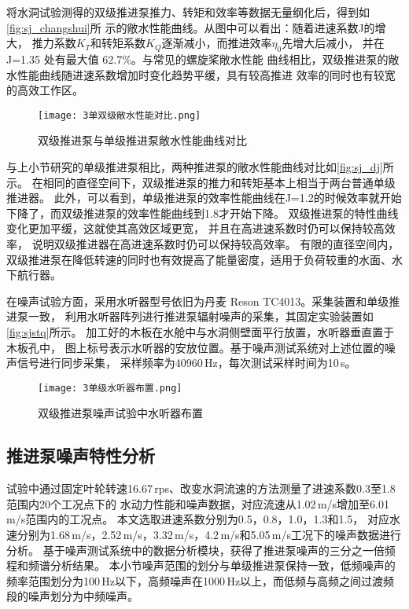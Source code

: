 将水洞试验测得的双级推进泵推力、转矩和效率等数据无量纲化后，得到如\autoref{fig:sj_changshui}所
示的敞水性能曲线。从图中可以看出：随着进速系数J的增大，
推力系数$K_T$和转矩系数$K_Q$逐渐减小，而推进效率$\eta_0$先增大后减小，
并在 J=1.35 处有最大值 62.7\%。与常见的螺旋桨敞水性能
曲线相比，双级推进泵的敞水性能曲线随进速系数增加时变化趋势平缓，具有较高推进
效率的同时也有较宽的高效工作区。
\begin{figure}[htbp]
    \centering
    \texttt{[image: 3单双级敞水性能对比.png]}
    \caption{\label{fig:sj_dj}双级推进泵与单级推进泵敞水性能曲线对比}
\end{figure}

与上小节研究的单级推进泵相比，两种推进泵的敞水性能曲线对比如\autoref{fig:sj_dj}所示。
在相同的直径空间下，双级推进泵的推力和转矩基本上相当于两台普通单级推进器。
此外，可以看到，单级推进泵的效率性能曲线在J=1.2的时候效率就开始下降了，而双级推进泵的效率性能曲线到1.8才开始下降。
双级推进泵的特性曲线变化更加平缓，这就使其高效区域更宽，
并且在高进速系数时仍可以保持较高效率，
说明双级推进器在高进速系数时仍可以保持较高效率。
有限的直径空间内，双级推进泵在降低转速的同时也有效提高了能量密度，适用于负荷较重的水面、水下航行器。

在噪声试验方面，采用水听器型号依旧为丹麦 Reson TC4013。采集装置和单级推进泵一致，
利用水听器阵列进行推进泵辐射噪声的采集，其固定实验装置如\autoref{fig:sjstq}所示。
加工好的木板在水舱中与水洞侧壁面平行放置，水听器垂直置于木板孔中，
图上标号表示水听器的安放位置。基于噪声测试系统对上述位置的噪声信号进行同步采集，
采样频率为40960\,Hz，每次测试采样时间为10\,s。
\begin{figure}[htbp]
    \centering
    \texttt{[image: 3单级水听器布置.png]}
    \caption{\label{fig:sjstq}双级推进泵噪声试验中水听器布置}
\end{figure}
\subsection{推进泵噪声特性分析}
试验中通过固定叶轮转速16.67\,rps、改变水洞流速的方法测量了进速系数0.3至1.8范围内20个工况点下的
水动力性能和噪声数据，对应流速从1.02\,m/s增加至6.01\,m/s范围内的工况点。
本文选取进速系数分别为0.5，0.8，1.0，1.3和1.5，
对应水速分别为1.68\,m/s，2.52\,m/s，3.32\,m/s，4.2\,m/s和5.05\,m/s工况下的噪声数据进行分析。
基于噪声测试系统中的数据分析模块，获得了推进泵噪声的三分之一倍频程和频谱分析结果。
本小节噪声范围的划分与单级推进泵保持一致，低频噪声的频率范围划分为100\,Hz以下，高频噪声在1000\,Hz以上，而低频与高频之间过渡频
段的噪声划分为中频噪声。
